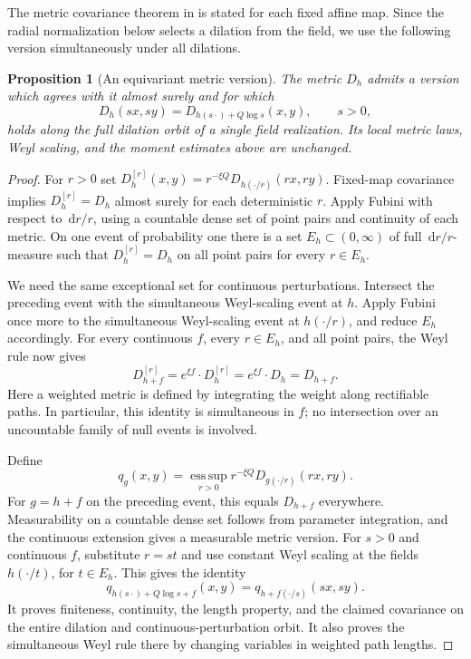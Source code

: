 \documentclass[11pt,reqno]{amsart}
\theoremstyle{plain}
\newtheorem{proposition}[theorem]{Proposition}
\theoremstyle{definition}
\theoremstyle{remark}
\newcommand{\1}{\mathbf{1}}
\newcommand{\dd}{\,\mathrm d}
\begin{document}
The metric covariance theorem in \cite{Bonanno} is stated for each fixed affine map. Since the radial normalization below selects a dilation from the field, we use the following version simultaneously under all dilations.
\begin{proposition}[An equivariant metric version]\label{prop:scale}
The metric $D_h$ admits a version which agrees with it almost surely and for which
\begin{equation}\label{eq:exact-dilate}
D_h(sx,sy)=D_{h(s\cdot)+Q\log s}(x,y),\qquad s>0,
\end{equation}
holds along the full dilation orbit of a single field realization. Its local metric laws, Weyl scaling, and the moment estimates above are unchanged.
\end{proposition}
\begin{proof}
For $r>0$ set $D_h^{[r]}(x,y)=r^{-\xi Q}D_{h(\cdot/r)}(rx,ry)$. Fixed-map covariance implies $D_h^{[r]}=D_h$ almost surely for each deterministic $r$. Apply Fubini with respect to $\dd r/r$, using a countable dense set of point pairs and continuity of each metric. On one event of probability one there is a set $E_h\subset(0,\infty)$ of full $\dd r/r$-measure such that $D_h^{[r]}=D_h$ on all point pairs for every $r\in E_h$.

We need the same exceptional set for continuous perturbations. Intersect the preceding event with the simultaneous Weyl-scaling event at $h$. Apply Fubini once more to the simultaneous Weyl-scaling event at $h(\cdot/r)$, and reduce $E_h$ accordingly. For every continuous $f$, every $r\in E_h$, and all point pairs, the Weyl rule now gives
\begin{equation*}
D_{h+f}^{[r]}=e^{\xi f}\cdot D_h^{[r]}=e^{\xi f}\cdot D_h=D_{h+f}.
\end{equation*}
Here a weighted metric is defined by integrating the weight along rectifiable paths. In particular, this identity is simultaneous in $f$; no intersection over an uncountable family of null events is involved.

Define
\begin{equation*}
q_g(x,y)=\operatorname*{ess\,sup}_{r>0}r^{-\xi Q}D_{g(\cdot/r)}(rx,ry).
\end{equation*}
For $g=h+f$ on the preceding event, this equals $D_{h+f}$ everywhere. Measurability on a countable dense set follows from parameter integration, and the continuous extension gives a measurable metric version. For $s>0$ and continuous $f$, substitute $r=st$ and use constant Weyl scaling at the fields $h(\cdot/t)$, for $t\in E_h$. This gives the identity
\begin{equation*}
q_{h(s\cdot)+Q\log s+f}(x,y)
=q_{h+f(\cdot/s)}(sx,sy).
\end{equation*}
It proves finiteness, continuity, the length property, and the claimed covariance on the entire dilation and continuous-perturbation orbit. It also proves the simultaneous Weyl rule there by changing variables in weighted path lengths.


\end{proof}
\end{document}
